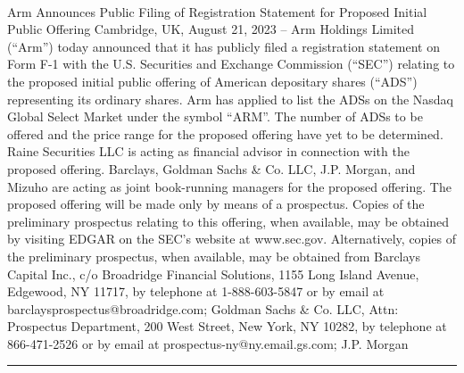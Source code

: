 \documentclass[10pt,a4paper]{article}
\begin{document}
\begin{multicols*}{2}
\paragraph{}
Arm Announces Public Filing of Registration Statement for Proposed Initial Public Offering
Cambridge, UK, August 21, 2023 – Arm Holdings Limited (“Arm”) today announced that it has publicly filed a registration statement on Form F-1 with the U.S. Securities and Exchange Commission (“SEC”) relating to the proposed initial public offering of American depositary shares (“ADS”) representing its ordinary shares. Arm has applied to list the ADSs on the Nasdaq Global Select Market under the symbol “ARM”. The number of ADSs to be offered and the price range for the proposed offering have yet to be determined.
Raine Securities LLC is acting as financial advisor in connection with the proposed offering. Barclays, Goldman Sachs \& Co. LLC, J.P. Morgan, and Mizuho are acting as joint book-running managers for the proposed offering.
The proposed offering will be made only by means of a prospectus. Copies of the preliminary prospectus relating to this offering, when available, may be obtained by visiting EDGAR on the SEC's website at www.sec.gov. Alternatively, copies of the preliminary prospectus, when available, may be obtained from Barclays Capital Inc., c/o Broadridge Financial Solutions, 1155 Long Island Avenue, Edgewood, NY 11717, by telephone at 1-888-603-5847 or by email at barclaysprospectus@broadridge.com; Goldman Sachs \& Co. LLC, Attn: Prospectus Department, 200 West Street, New York, NY 10282, by telephone at 866-471-2526 or by email at prospectus-ny@ny.email.gs.com; J.P. Morgan
\par\noindent\textcolor{red}{\rule{\linewidth}{0.2mm}}
\vfill
\null
\noindent\begin{minipage}{\linewidth}

\end{minipage}
\end{multicols*}
\end{document}

